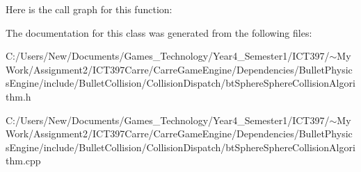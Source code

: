 Here is the call graph for this function:

The documentation for this class was generated from the following files:\begin{CompactItemize}
\item 
C:/Users/New/Documents/Games\_\-Technology/Year4\_\-Semester1/ICT397/$\sim$My Work/Assignment2/ICT397Carre/CarreGameEngine/Dependencies/BulletPhysicsEngine/include/BulletCollision/CollisionDispatch/btSphereSphereCollisionAlgorithm.h\item 
C:/Users/New/Documents/Games\_\-Technology/Year4\_\-Semester1/ICT397/$\sim$My Work/Assignment2/ICT397Carre/CarreGameEngine/Dependencies/BulletPhysicsEngine/include/BulletCollision/CollisionDispatch/btSphereSphereCollisionAlgorithm.cpp\end{CompactItemize}
